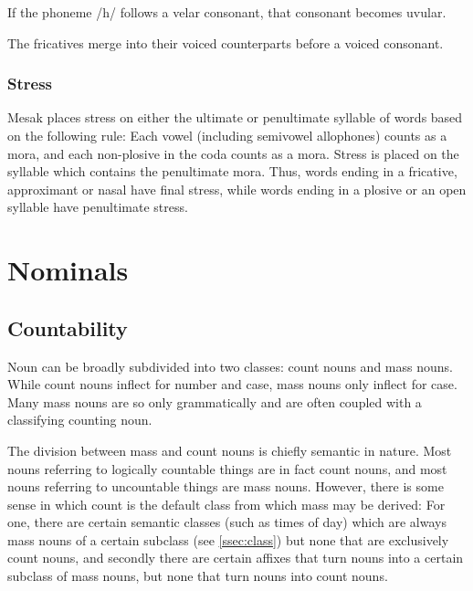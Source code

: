 \documentclass[paper=6in:9in, fontsize=10.5]{scrbook}
\makeatletter
\renewcommand\paragraph{\@startsection{paragraph}{4}{\z@}{\parskip}{-1em}{\normalfont\normalsize\bfseries}}
\newcommand{\ý}{ɨ́}
\makeatother
\begin{document}
\paragraph{K → Q / \_h} If the phoneme /h/ follows a velar consonant, that consonant becomes uvular.

\paragraph{s, ʂ → z, ɻ ~ / \_C[+voice]} The fricatives merge into their voiced counterparts before a voiced consonant.



\subsection{Stress}
Mesak places stress on either the ultimate or penultimate syllable of words based on the following rule: Each vowel (including semivowel allophones) counts as a mora, and each non-plosive in the coda counts as a mora. Stress is placed on the syllable which contains the penultimate mora. Thus, words ending in a fricative, approximant or nasal have final stress, while words ending in a plosive or an open syllable have penultimate stress.

\chapter{Nominals}

\section{Countability}
Noun can be broadly subdivided into two classes: count nouns and mass nouns. While count nouns inflect for number and case, mass nouns only inflect for case. Many mass nouns are so only grammatically and are often coupled with a classifying counting noun. 

The division between mass and count nouns is chiefly semantic in nature. Most nouns referring to logically countable things are in fact count nouns, and most nouns referring to uncountable things are mass nouns. However, there is some sense in which count is the default class from which mass may be derived: For one, there are certain semantic classes (such as times of day) which are always mass nouns of a certain subclass (see \ref{ssec:class}) but none that are exclusively count nouns, and secondly there are certain affixes that turn nouns into a certain subclass of mass nouns, but none that turn nouns into count nouns.
\end{document}
